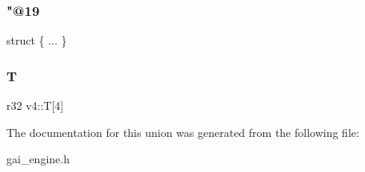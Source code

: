 \subsubsection{\texorpdfstring{"@19}{@19}}
{\footnotesize\ttfamily struct \{ ... \} }

\mbox{\label{unionv4_a687f6cd845ea4e01e555d494d965a04c}} 
\subsubsection{\texorpdfstring{T}{T}}
{\footnotesize\ttfamily r32 v4\+::T\mbox{[}4\mbox{]}}



The documentation for this union was generated from the following file\+:\begin{DoxyCompactItemize}
\item 
gai\+\_\+engine.\+h\end{DoxyCompactItemize}

